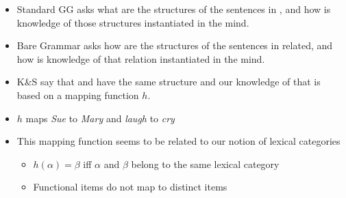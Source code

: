 \documentclass[letterpaper]{article}
\begin{document}
\begin{itemize}
  \item Standard GG asks what are the structures of the sentences in \Last, and how is knowledge of those structures instantiated in the mind.
  \item Bare Grammar asks how are the structures of the sentences in \Last related, and how is knowledge of that relation instantiated in the mind.
  \item K\&S say that \Last[a] and \Last[b] have the same structure and our knowledge of that is based on a mapping function $h$.
  \item $h$ maps \textit{Sue} to \textit{Mary} and \textit{laugh} to \textit{cry}
  \item This mapping function seems to be related to our notion of lexical categories
    \begin{itemize}
      \item $h(\alpha) = \beta$ iff $\alpha$ and $\beta$ belong to the same lexical category
      \item Functional items do not map to distinct items
    \end{itemize}
\end{itemize}
\end{document}
